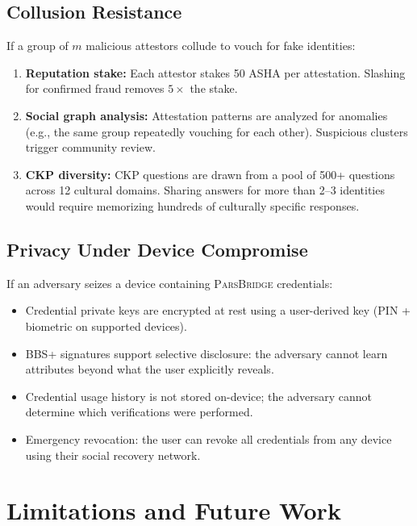 \documentclass[11pt,a4paper]{article}
\newcommand{\bridge}{\textsc{ParsBridge}\xspace}
\begin{document}
\subsection{Collusion Resistance}

If a group of $m$ malicious attestors collude to vouch for fake identities:

\begin{enumerate}
    \item \textbf{Reputation stake:} Each attestor stakes 50 ASHA per attestation. Slashing for confirmed fraud removes $5\times$ the stake.
    \item \textbf{Social graph analysis:} Attestation patterns are analyzed for anomalies (e.g., the same group repeatedly vouching for each other). Suspicious clusters trigger community review.
    \item \textbf{CKP diversity:} CKP questions are drawn from a pool of 500+ questions across 12 cultural domains. Sharing answers for more than 2--3 identities would require memorizing hundreds of culturally specific responses.
\end{enumerate}

\subsection{Privacy Under Device Compromise}

If an adversary seizes a device containing \bridge credentials:

\begin{itemize}
    \item Credential private keys are encrypted at rest using a user-derived key (PIN + biometric on supported devices).
    \item BBS+ signatures support selective disclosure: the adversary cannot learn attributes beyond what the user explicitly reveals.
    \item Credential usage history is not stored on-device; the adversary cannot determine which verifications were performed.
    \item Emergency revocation: the user can revoke all credentials from any device using their social recovery network.
\end{itemize}

\section{Limitations and Future Work}
\end{document}
